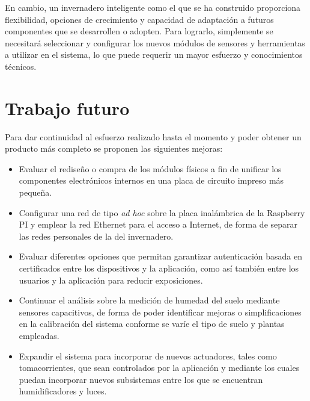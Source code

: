 En cambio, un invernadero inteligente como el que se ha construido proporciona flexibilidad, opciones de crecimiento y capacidad de adaptación a futuros componentes que se desarrollen o adopten. Para lograrlo, simplemente se necesitará seleccionar y configurar los nuevos módulos de sensores y herramientas a utilizar en el sistema, lo que puede requerir un mayor esfuerzo y conocimientos técnicos.






\section{Trabajo futuro}

Para dar continuidad al esfuerzo realizado hasta el momento y poder obtener un producto más completo se proponen
 las siguientes mejoras:

\begin{itemize}
\item Evaluar el rediseño o compra de los módulos físicos a fin de unificar los componentes electrónicos internos en una placa de circuito impreso más pequeña. %

\item Configurar una red de tipo \textit{ad hoc} sobre la placa inalámbrica de la Raspberry PI y emplear la red Ethernet para el acceso a Internet, de forma de separar las redes personales de la del invernadero.

\item Evaluar diferentes opciones que permitan garantizar autenticación basada en certificados entre los dispositivos y la aplicación, como así también entre los usuarios y la aplicación para reducir exposiciones.

\item Continuar el análisis sobre la medición de humedad del suelo mediante sensores capacitivos, de forma de poder identificar mejoras o simplificaciones en la calibración del sistema conforme se varíe el tipo de suelo y plantas empleadas. 

\item Expandir el sistema para incorporar de nuevos actuadores, tales como tomacorrientes, que sean controlados por la aplicación y mediante los cuales puedan incorporar nuevos subsistemas entre los que se encuentran humidificadores y luces. 

\end{itemize}